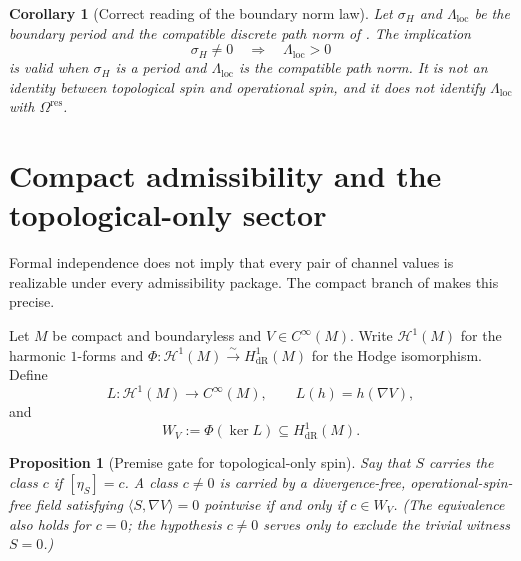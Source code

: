 \documentclass[11pt]{article}
\newtheorem{proposition}[theorem]{Proposition}
\newtheorem{corollary}[theorem]{Corollary}
\theoremstyle{definition}
\newcommand{\dR}{\mathrm{dR}}
\newcommand{\Omres}{\Omega^{\mathrm{res}}}
\begin{document}
\begin{corollary}[Correct reading of the boundary norm law]
Let \(\sigma_H\) and \(\Lambda_{\mathrm{loc}}\) be the boundary period and
the compatible discrete path norm of \cite{structural}.  The implication
\[
\sigma_H\neq0\quad\Longrightarrow\quad
\Lambda_{\mathrm{loc}}>0
\]
is valid when \(\sigma_H\) is a period and
\(\Lambda_{\mathrm{loc}}\) is the compatible path norm.  It is not an
identity between topological spin and operational spin, and it does not
identify \(\Lambda_{\mathrm{loc}}\) with \(\Omres\).
\end{corollary}

\section{Compact admissibility and the topological-only sector}
\label{sec:compact}

Formal independence does not imply that every pair of channel values is
realizable under every admissibility package.  The compact branch of
\cite{structural} makes this precise.

Let \(M\) be compact and boundaryless and \(V\in C^\infty(M)\).  Write \(\mathcal H^1(M)\) for
the harmonic \(1\)-forms and
\(\Phi:\mathcal H^1(M)\xrightarrow{\sim}H^1_{\dR}(M)\) for the Hodge
isomorphism.  Define
\[
L:\mathcal H^1(M)\to C^\infty(M),\qquad
L(h)=h(\nabla V),
\]
and
\[
W_V:=\Phi(\ker L)\subseteq H^1_{\dR}(M).
\]

\begin{proposition}[Premise gate for topological-only spin]
\label{prop:WV}
Say that \(S\) \emph{carries} the class \(c\) if \([\eta_S]=c\).  A class
\(c\neq0\) is carried by a divergence-free, operational-spin-free field
satisfying \(\langle S,\nabla V\rangle=0\) pointwise if and only if
\(c\in W_V\).  (The equivalence also holds for \(c=0\); the hypothesis
\(c\neq0\) serves only to exclude the trivial witness \(S=0\).)
\end{proposition}
\end{document}
